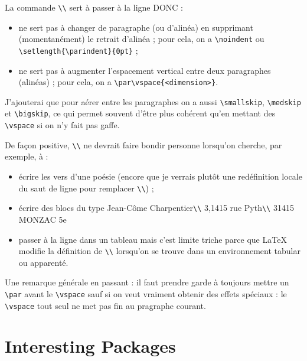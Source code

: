 \documentclass{boostreport}
\begin{document}
La commande \verb|\\| sert à passer à la ligne DONC :

\begin{itemize}
    \item ne sert pas à changer de paragraphe (ou d'alinéa) en supprimant
    (momentanément) le retrait d'alinéa ; pour cela, on a \verb|\noindent|
    ou \verb|\setlength{\parindent}{0pt}| ;

    \item ne sert pas à augmenter l'espacement vertical entre deux
    paragraphes (alinéas) ; pour cela, on a \verb|\par\vspace{<dimension>}|.
\end{itemize}

J'ajouterai que pour aérer entre les paragraphes on a aussi
\verb|\smallskip|, \verb|\medskip| et \verb|\bigskip|, ce qui permet souvent
d'être plus cohérent qu'en mettant des \verb|\vspace| si on n'y fait pas
gaffe.

De façon positive, \verb|\\| ne devrait faire bondir personne lorsqu'on
cherche, par exemple, à :

\begin{itemize}
    \item écrire les vers d'une poésie (encore que je verrais plutôt une
    redéfinition locale du saut de ligne pour remplacer \verb|\\|) ;

    \item écrire des blocs du type
    Jean-Côme Charpentier\verb|\\|
    3,1415 rue Pyth\verb|\\|
    31415 MONZAC 5e

    \item passer à la ligne dans un tableau mais c'est limite triche parce
    que LaTeX modifie la définition de \verb|\\| lorsqu'on se trouve dans un
    environnement tabular ou apparenté.
\end{itemize}

Une remarque générale en passant : il faut prendre garde à toujours mettre
un \verb|\par| avant le \verb|\vspace| sauf si on veut vraiment obtenir des
effets spéciaux : le \verb|\vspace| tout seul ne met pas fin au pragraphe
courant.


\section{Interesting Packages}
\label{sec:interesting-packages}
\end{document}
